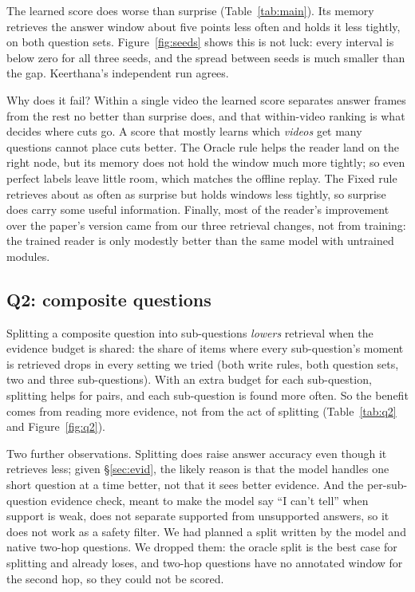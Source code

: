 \documentclass[11pt,a4paper]{article}
\begin{document}
The learned score does worse than surprise (Table~\ref{tab:main}). Its memory retrieves the answer window about five points
less often and holds it less tightly, on both question sets. Figure~\ref{fig:seeds} shows this is not luck: every interval
is below zero for all three seeds, and the spread between seeds is much smaller than the gap. Keerthana's independent run
agrees.

Why does it fail? Within a single video the learned score separates answer frames from the rest no better than surprise
does, and that within-video ranking is what decides where cuts go. A score that mostly learns which \emph{videos} get many
questions cannot place cuts better. The Oracle rule helps the reader land on the right node, but its memory does not hold
the window much more tightly; so even perfect labels leave little room, which matches the offline replay. The Fixed rule
retrieves about as often as surprise but holds windows less tightly, so surprise does carry some useful information.
Finally, most of the reader's improvement over the paper's version came from our three retrieval changes, not from
training: the trained reader is only modestly better than the same model with untrained modules.

\subsection{Q2: composite questions}\label{sec:q2}

Splitting a composite question into sub-questions \emph{lowers} retrieval when the evidence budget is shared: the share of
items where every sub-question's moment is retrieved drops in every setting we tried (both write rules, both question sets,
two and three sub-questions). With an extra budget for each sub-question, splitting helps for pairs, and each sub-question
is found more often. So the benefit comes from reading more evidence, not from the act of splitting (Table~\ref{tab:q2} and
Figure~\ref{fig:q2}).

Two further observations. Splitting does raise answer accuracy even though it retrieves less; given \S\ref{sec:evid}, the
likely reason is that the model handles one short question at a time better, not that it sees better evidence. And the
per-sub-question evidence check, meant to make the model say ``I can't tell'' when support is weak, does not separate
supported from unsupported answers, so it does not work as a safety filter. We had planned a split written by the model and
native two-hop questions. We dropped them: the oracle split is the best case for splitting and already loses, and two-hop
questions have no annotated window for the second hop, so they could not be scored.
\end{document}
